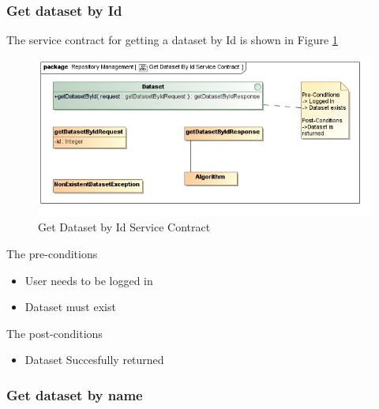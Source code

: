\subsubsection {Get dataset by Id}
The service contract for getting a dataset by Id is shown in Figure \ref{fig:getDatasetByIdService}
\begin{figure}[H]
  \begin{center}
  \includegraphics[scale=0.6]{../Diagrams and Charts/Test Data/Get Dataset By Id Service Contract.jpg}
  \caption{Get Dataset by Id Service Contract}
  \label{fig:getDatasetByIdService}
  \end{center}
  
\end{figure}

The pre-conditions
\begin{itemize}
  \item User needs to be logged in
  \item Dataset must exist
\end{itemize}

The post-conditions
\begin{itemize}
  \item Dataset Succesfully returned
\end{itemize}

\subsubsection {Get dataset by name}

